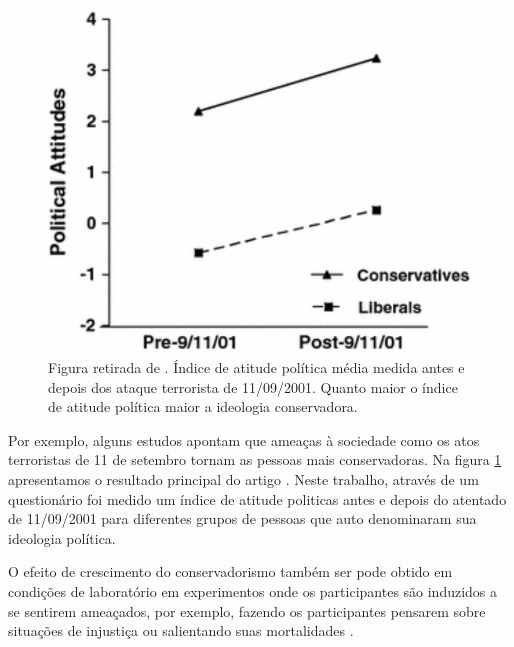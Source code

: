 \begin{figure}
    \centering
    \includegraphics[scale=0.7]{Figures/nail_threat}
    \caption{
        Figura retirada de \citep{Nail2009}. Índice de atitude
        política média medida antes e depois dos ataque terrorista de
        11/09/2001. Quanto maior o índice de atitude política maior a
        ideologia conservadora.
    }
    \label{fig:nail}
\end{figure}

Por exemplo, alguns estudos apontam que ameaças à sociedade como os
atos terroristas de 11 de setembro tornam as pessoas mais
conservadoras\citep{Bonanno2006,Nail2009}. Na figura \ref{fig:nail}
apresentamos o resultado principal do artigo \citep{Nail2009}. Neste trabalho,
através de um questionário foi medido um índice de atitude politicas antes e
depois do atentado de 11/09/2001 para diferentes grupos de pessoas que
auto denominaram sua ideologia política. 

O efeito de crescimento do conservadorismo também ser pode obtido em
condições de laboratório em experimentos onde os participantes são
induzidos a se sentirem ameaçados, por exemplo, fazendo os participantes
pensarem sobre situações de injustiça ou salientando suas mortalidades
.

